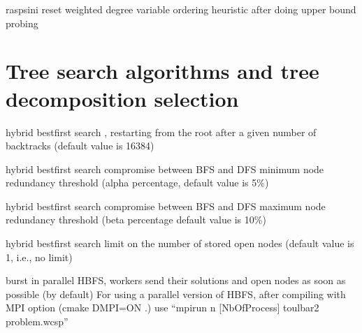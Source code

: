 \documentclass[letterpaper,10pt,openany,oneside,english]{sphinxmanual}
\begin{document}
\begin{optionlist}{3cm}
\item [\sphinxhyphen{}raspsini]  
\sphinxAtStartPar
reset weighted degree variable ordering heuristic after doing
upper bound probing
\end{optionlist}


\section{Tree search algorithms and tree decomposition selection}
\label{\detokenize{userdoc:tree-search-algorithms-and-tree-decomposition-selection}}\begin{description}
\sphinxAtStartPar
hybrid best\sphinxhyphen{}first search , restarting from the
root after a given number of backtracks (default value is 16384)

\sphinxAtStartPar
hybrid best\sphinxhyphen{}first search compromise between BFS and DFS minimum node redundancy
threshold (alpha percentage, default value is 5\%)

\sphinxAtStartPar
hybrid best\sphinxhyphen{}first search compromise between BFS and DFS maximum node redundancy
threshold (beta percentage default value is 10\%)

\sphinxAtStartPar
hybrid best\sphinxhyphen{}first search limit on the number
of stored open nodes (default value is \sphinxhyphen{}1, i.e., no limit)

\end{description}
\begin{optionlist}{3cm}
\item [\sphinxhyphen{}burst]  
\sphinxAtStartPar
in parallel HBFS, workers send their solutions and open nodes as soon as possible (by default)
For using a parallel version of HBFS, after compiling with MPI option (cmake \sphinxhyphen{}DMPI=ON .)
use “mpirun \sphinxhyphen{}n {[}NbOfProcess{]} toulbar2 problem.wcsp”
\end{optionlist}
\end{document}
